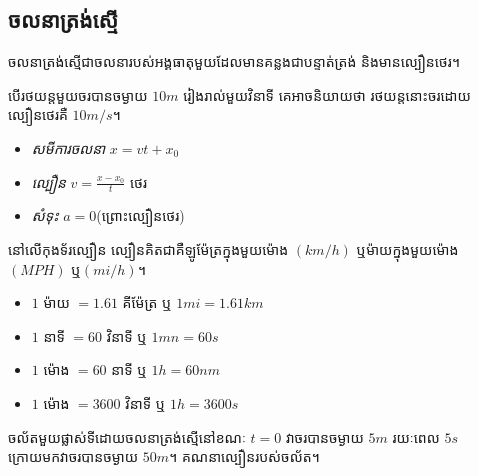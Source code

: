 \subsection{ចលនាត្រង់ស្មើ}
\begin{definition}
	ចលនាត្រង់ស្មើជាចលនារបស់អង្គធាតុមួយដែលមានគន្លងជាបន្ទាត់ត្រង់ និងមានល្បឿនថេរ។
\end{definition}
\begin{example}
	បើរថយន្តមួយចរបានចម្ងាយ $10m$ រៀងរាល់មួយវិនាទី គេអាចនិយាយថា រថយន្តនោះចរដោយល្បឿនថេរគឺ $10m/s$។
\end{example}
\begin{multicols}{3}
	\begin{itemize}
		\item \emph{\kml សមីការចលនា} $x=vt+x_{0}$
		\item \emph{\kml ល្បឿន} $v=\frac{x-x_{0}}{t}$ ថេរ
		\item \emph{\kml សំទុះ} $a=0$(ព្រោះល្បឿនថេរ)
	\end{itemize}
\end{multicols}
\begin{remark}
	នៅលើកុងទ័រល្បឿន ល្បឿនគិតជាគឺឡូម៉ែត្រក្នុងមួយម៉ោង $\left(km/h\right)$ ឬម៉ាយក្នុងមួយម៉ោង $\left(MPH\right)$  ឬ​$\left(mi/h\right)$។
	\begin{multicols}{2}
		\begin{itemize}
			\item $1$ ម៉ាយ $=1.61$ គីម៉ែត្រ ឬ $1mi=1.61km$
			\item $1$ នាទី $=60$ វិនាទី ឬ $1mn=60s$
			\item $1$ ម៉ោង $=60$ នាទី ឬ $1h=60nm$
			\item $1$ ម៉ោង $=3600$ វិនាទី ឬ $1h=3600s$
		\end{itemize}
	\end{multicols}
\end{remark}
\begin{example}
	ចល័តមួយផ្លាស់ទីដោយចលនាត្រង់ស្មើនៅខណៈ $t=0$ វាចរបានចម្ងាយ $5m$ រយៈពេល $5s$ ក្រោយមកវាចរបានចម្ងាយ $50m$។ គណនាល្បឿនរបស់ចល័ត។
\end{example}
